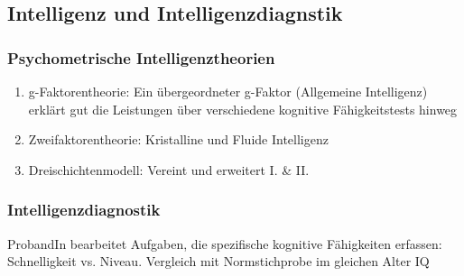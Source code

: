 \subsection{Intelligenz und Intelligenzdiagnstik}
\subsubsection{Psychometrische Intelligenztheorien}
\begin{enumerate}
	\item g-Faktorentheorie: Ein übergeordneter g-Faktor (Allgemeine Intelligenz) erklärt gut die Leistungen über verschiedene kognitive Fähigkeitstests hinweg
	\item Zweifaktorentheorie: Kristalline und Fluide Intelligenz
	\item Dreischichtenmodell: Vereint und erweitert I. \& II.
\end{enumerate}
\subsubsection{Intelligenzdiagnostik}
ProbandIn bearbeitet Aufgaben, die spezifische kognitive
Fähigkeiten erfassen: Schnelligkeit vs. Niveau. Vergleich mit Normstichprobe im gleichen Alter \rightarrow IQ






